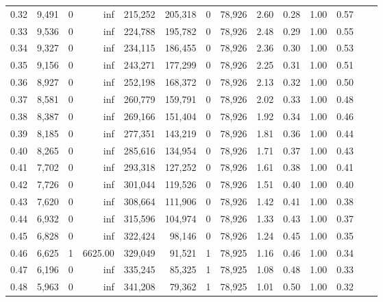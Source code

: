 \begin{tabular}{rrrrrrrrrrrrrr}
0.32 &  9,491 &      0 &      inf &  215,252 &  205,318 &       0 &  78,926 &  2.60 &  0.28 &  1.00 &      0.57 \\
0.33 &  9,536 &      0 &      inf &  224,788 &  195,782 &       0 &  78,926 &  2.48 &  0.29 &  1.00 &      0.55 \\
0.34 &  9,327 &      0 &      inf &  234,115 &  186,455 &       0 &  78,926 &  2.36 &  0.30 &  1.00 &      0.53 \\
0.35 &  9,156 &      0 &      inf &  243,271 &  177,299 &       0 &  78,926 &  2.25 &  0.31 &  1.00 &      0.51 \\
0.36 &  8,927 &      0 &      inf &  252,198 &  168,372 &       0 &  78,926 &  2.13 &  0.32 &  1.00 &      0.50 \\
0.37 &  8,581 &      0 &      inf &  260,779 &  159,791 &       0 &  78,926 &  2.02 &  0.33 &  1.00 &      0.48 \\
0.38 &  8,387 &      0 &      inf &  269,166 &  151,404 &       0 &  78,926 &  1.92 &  0.34 &  1.00 &      0.46 \\
0.39 &  8,185 &      0 &      inf &  277,351 &  143,219 &       0 &  78,926 &  1.81 &  0.36 &  1.00 &      0.44 \\
0.40 &  8,265 &      0 &      inf &  285,616 &  134,954 &       0 &  78,926 &  1.71 &  0.37 &  1.00 &      0.43 \\
0.41 &  7,702 &      0 &      inf &  293,318 &  127,252 &       0 &  78,926 &  1.61 &  0.38 &  1.00 &      0.41 \\
0.42 &  7,726 &      0 &      inf &  301,044 &  119,526 &       0 &  78,926 &  1.51 &  0.40 &  1.00 &      0.40 \\
0.43 &  7,620 &      0 &      inf &  308,664 &  111,906 &       0 &  78,926 &  1.42 &  0.41 &  1.00 &      0.38 \\
0.44 &  6,932 &      0 &      inf &  315,596 &  104,974 &       0 &  78,926 &  1.33 &  0.43 &  1.00 &      0.37 \\
0.45 &  6,828 &      0 &      inf &  322,424 &   98,146 &       0 &  78,926 &  1.24 &  0.45 &  1.00 &      0.35 \\
0.46 &  6,625 &      1 &  6625.00 &  329,049 &   91,521 &       1 &  78,925 &  1.16 &  0.46 &  1.00 &      0.34 \\
0.47 &  6,196 &      0 &      inf &  335,245 &   85,325 &       1 &  78,925 &  1.08 &  0.48 &  1.00 &      0.33 \\
0.48 &  5,963 &      0 &      inf &  341,208 &   79,362 &       1 &  78,925 &  1.01 &  0.50 &  1.00 &      0.32 \\

\end{tabular}
